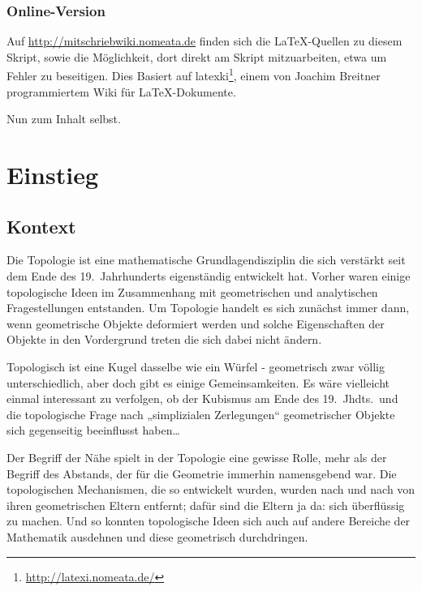 \documentclass[12pt]{scrbook}   %
\begin{document}
\subsection*{Online-Version}
Auf \url{http://mitschriebwiki.nomeata.de} finden sich die \LaTeX-Quellen zu diesem Skript, sowie die Möglichkeit, dort direkt am Skript mitzuarbeiten, etwa um Fehler zu beseitigen. Dies Basiert auf latexki\footnote{\url{http://latexi.nomeata.de/}}, einem von Joachim Breitner programmiertem Wiki für \LaTeX-Dokumente.

\bigskip

Nun zum Inhalt selbst.

\setcounter{chapter}{0}
\renewcommand{\thechapter}{\Roman{chapter}}

\chapter{Einstieg}

\section{Kontext}




Die Topologie ist eine mathematische Grundlagendisziplin die sich verstärkt
seit dem Ende des 19.\ Jahrhunderts eigenständig entwickelt hat. Vorher waren
einige topologische Ideen im Zusammenhang mit geometrischen und analytischen 
Fragestellungen entstanden. Um Topologie handelt es sich zunächst immer dann,
wenn geometrische Objekte deformiert werden und solche Eigenschaften der 
Objekte in den Vordergrund treten die sich dabei nicht ändern. 

Topologisch ist eine Kugel dasselbe wie ein Würfel - geometrisch zwar 
völlig unterschiedlich, aber doch gibt es einige Gemeinsamkeiten. 
Es wäre vielleicht einmal interessant zu verfolgen, ob der Kubismus am Ende
des 19.\ Jhdts.\ und die topologische Frage nach „simplizialen 
Zerlegungen“ geometrischer Objekte sich gegenseitig beeinflusst haben\dots

Der Begriff der Nähe spielt in der Topologie eine gewisse Rolle, mehr als der
Begriff des Abstands, der für die Geometrie immerhin namensgebend war.
Die topologischen 
Mechanismen, die so entwickelt wurden, wurden nach und nach von ihren 
geometrischen Eltern entfernt; dafür sind die Eltern ja da: sich 
überflüssig zu machen. Und so konnten topologische Ideen sich auch auf 
andere Bereiche der Mathematik ausdehnen und diese geometrisch durchdringen.
\end{document}
